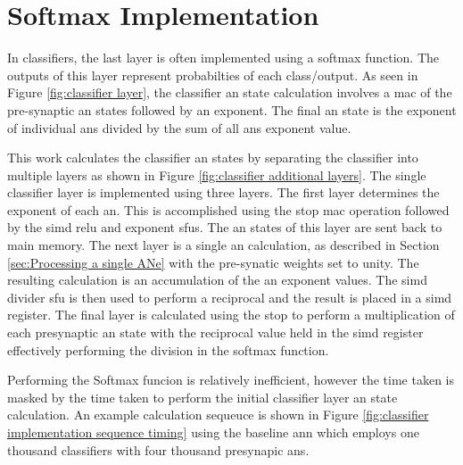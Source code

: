 
\chapter{Softmax Implementation}
\label{sec:Appendix-A}
\label{sec:Softmax Implementation}

In classifiers, the last layer is often implemented using a softmax \cite{wikipedia_softmax} function.
The outputs of this layer represent probabilties of each class/output.
As seen in Figure \ref{fig:classifier layer}, the classifier \ac{an} state calculation involves a \ac{mac} of the pre-synaptic \ac{an} states followed by an exponent.
The final \ac{an} state is the exponent of individual \acp{an} divided by the sum of all \acp{an} exponent value.

This work calculates the classifier \ac{an} states by separating the classifier into multiple layers as shown in Figure \ref{fig:classifier additional layers}.
The single classifier layer is implemented using three layers.
The first layer determines the exponent of each \ac{an}. This is accomplished using the \ac{stop} \ac{mac} operation followed by the \ac{simd} \ac{relu} and exponent \acp{sfu}.
The \ac{an} states of this layer are sent back to main memory.
The next layer is a single \ac{an} calculation, as described in Section \ref{sec:Processing a single ANe} with the pre-synatic weights set to unity.
The resulting calculation is an accumulation of the \ac{an} exponent values.
The \ac{simd} divider \ac{sfu} is then used to perform a reciprocal and the result is placed in a \ac{simd} register.
The final layer is calculated using the \ac{stop} to perform a multiplication of each presynaptic \ac{an} state with the reciprocal value held in the \ac{simd} register effectively performing the division in the softmax function.

Performing the Softmax funcion is relatively inefficient, however the time taken is masked by the time taken to perform the initial classifier layer \ac{an} state calculation.
An example calculation sequeuce is shown in Figure \ref{fig:classifier implementation sequence timing} using the baseline \ac{ann} which employs one thousand classifiers with four thousand presynapic \acp{an}.



